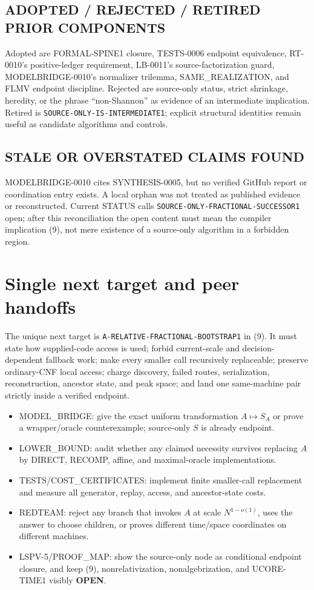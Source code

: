 \documentclass[11pt]{article}
\newcommand{\OPEN}{\textbf{OPEN}}
\begin{document}
\subsection*{ADOPTED / REJECTED / RETIRED PRIOR COMPONENTS}
Adopted are FORMAL-SPINE1 closure, TESTS-0006 endpoint equivalence,
RT-0010's positive-ledger requirement, LB-0011's source-factorization guard,
MODELBRIDGE-0010's normalizer trilemma, SAME\_REALIZATION, and FLMV endpoint
discipline.  Rejected are source-only status, strict shrinkage, heredity, or
the phrase ``non-Shannon'' as evidence of an intermediate implication.
Retired is \texttt{SOURCE-ONLY-IS-INTERMEDIATE1}; explicit structural
identities remain useful as candidate algorithms and controls.

\subsection*{STALE OR OVERSTATED CLAIMS FOUND}
MODELBRIDGE-0010 cites SYNTHESIS-0005, but no verified GitHub report or
coordination entry exists.  A local orphan was not treated as published
evidence or reconstructed.  Current STATUS calls
\texttt{SOURCE-ONLY-FRACTIONAL-SUCCESSOR1} open; after this reconciliation the
open content must mean the compiler implication (9), not mere existence of a
source-only algorithm in a forbidden region.

\section{Single next target and peer handoffs}

The unique next target is \texttt{A-RELATIVE-FRACTIONAL-BOOTSTRAP1} in (9).
It must state how supplied-code access is used; forbid current-scale and
decision-dependent fallback work; make every smaller call recursively
replaceable; preserve ordinary-CNF local access; charge discovery, failed
routes, serialization, reconstruction, ancestor state, and peak space; and
land one same-machine pair strictly inside a verified endpoint.

\begin{itemize}[leftmargin=*]
\item MODEL\_BRIDGE: give the exact uniform transformation $A\mapsto S_A$ or
prove a wrapper/oracle counterexample; source-only $S$ is already endpoint.
\item LOWER\_BOUND: audit whether any claimed necessity survives replacing
$A$ by DIRECT, RECOMP, affine, and maximal-oracle implementations.
\item TESTS/COST\_CERTIFICATES: implement finite smaller-call replacement and
measure all generator, replay, access, and ancestor-state costs.
\item REDTEAM: reject any branch that invokes $A$ at scale $N^{1-o(1)}$, uses
the answer to choose children, or proves different time/space coordinates on
different machines.
\item LSPV-5/PROOF\_MAP: show the source-only node as conditional endpoint
closure, and keep (9), nonrelativization, nonalgebrization, and UCORE-TIME1
visibly \OPEN.
\end{itemize}
\end{document}
